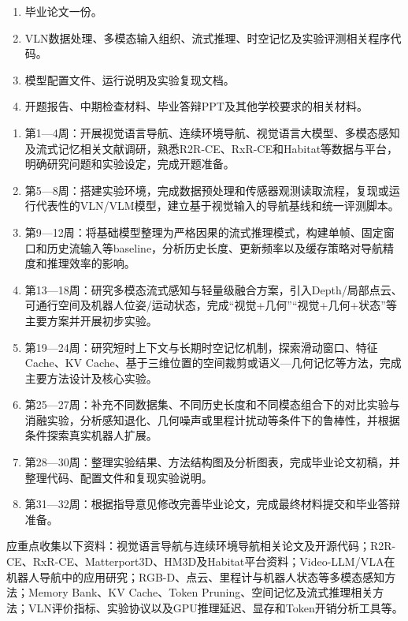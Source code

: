 
\begin{enumerate}
  \item 毕业论文一份。
  \item VLN数据处理、多模态输入组织、流式推理、时空记忆及实验评测相关程序代码。
  \item 模型配置文件、运行说明及实验复现文档。
  \item 开题报告、中期检查材料、毕业答辩PPT及其他学校要求的相关材料。
\end{enumerate}


\begin{enumerate}
  \item 第1—4周：开展视觉语言导航、连续环境导航、视觉语言大模型、多模态感知及流式记忆相关文献调研，熟悉R2R-CE、RxR-CE和Habitat等数据与平台，明确研究问题和实验设定，完成开题准备。
  \item 第5—8周：搭建实验环境，完成数据预处理和传感器观测读取流程，复现或运行代表性的VLN/VLM模型，建立基于视觉输入的导航基线和统一评测脚本。
  \item 第9—12周：将基础模型整理为严格因果的流式推理模式，构建单帧、固定窗口和历史流输入等baseline，分析历史长度、更新频率以及缓存策略对导航精度和推理效率的影响。
  \item 第13—18周：研究多模态流式感知与轻量级融合方案，引入Depth/局部点云、可通行空间及机器人位姿/运动状态，完成“视觉+几何”“视觉+几何+状态”等主要方案并开展初步实验。
  \item 第19—24周：研究短时上下文与长期时空记忆机制，探索滑动窗口、特征Cache、KV Cache、基于三维位置的空间裁剪或语义—几何记忆等方法，完成主要方法设计及核心实验。
  \item 第25—27周：补充不同数据集、不同历史长度和不同模态组合下的对比实验与消融实验，分析感知退化、几何噪声或里程计扰动等条件下的鲁棒性，并根据条件探索真实机器人扩展。
  \item 第28—30周：整理实验结果、方法结构图及分析图表，完成毕业论文初稿，并整理代码、配置文件和复现实验说明。
  \item 第31—32周：根据指导意见修改完善毕业论文，完成最终材料提交和毕业答辩准备。
\end{enumerate}


应重点收集以下资料：视觉语言导航与连续环境导航相关论文及开源代码；R2R-CE、RxR-CE、Matterport3D、HM3D及Habitat平台资料；Video-LLM/VLA在机器人导航中的应用研究；RGB-D、点云、里程计与机器人状态等多模态感知方法；Memory Bank、KV Cache、Token Pruning、空间记忆及流式推理相关方法；VLN评价指标、实验协议以及GPU推理延迟、显存和Token开销分析工具等。

